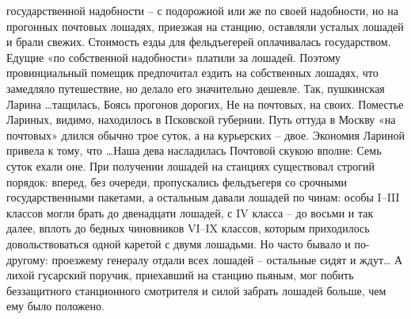 \documentclass[12pt,a4paper]{article}
\begin{document}
государственной надобности – с подорожной или же по
своей надобности, но на прогонных почтовых лошадях,
приезжая на станцию, оставляли усталых лошадей и брали
свежих. Стоимость езды для фельдъегерей оплачивалась
государством. Едущие «по собственной надобности» платили
за лошадей.
Поэтому провинциальный помещик предпочитал ездить
на собственных лошадях, что замедляло путешествие, но
делало его значительно дешевле.
Так, пушкинская Ларина
…тащилась,
Боясь прогонов дорогих,
Не на почтовых, на своих.
Поместье Лариных, видимо, находилось в Псковской
губернии. Путь оттуда в Москву «на почтовых» длился
обычно трое суток, а на курьерских – двое. Экономия
Лариной привела к тому, что
…Наша дева насладилась
Почтовой скукою вполне:
Семь суток ехали оне.
При получении лошадей на станциях существовал
строгий порядок: вперед, без очереди, пропускались
фельдъегеря со срочными государственными пакетами,
а остальным давали лошадей по чинам: особы I–III классов
могли брать до двенадцати лошадей, с IV класса – до восьми
и так далее, вплоть до бедных чиновников VI–IX классов,
которым приходилось довольствоваться одной каретой
с двумя лошадьми. Но часто бывало и по-другому:
проезжему генералу отдали всех лошадей – остальные сидят
и ждут… А лихой гусарский поручик, приехавший на станцию
пьяным, мог побить беззащитного станционного смотрителя
и силой забрать лошадей больше, чем ему было положено.
\end{document}
